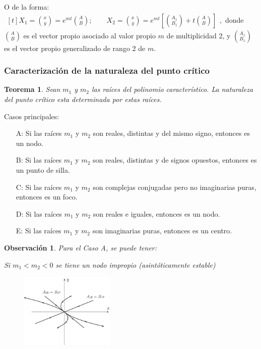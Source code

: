 \documentclass[a5paper,doc,10pt,noapacite]{apa6}
\newtheorem{teorema}{Teorema}
\newtheorem{observ}{Observación}
\begin{document}
{{\begin{APAenumerate}
	\vspace{1\baselineskip}
	\item O de la forma:
	\( \begin{aligned}[t]
	X_1 = \binom{x}{y}
		= e^{m t } \binom{A}{B}
	;
	\qquad
	X_2 = \binom{x}{y}
		= e^{m t } \left[ \binom{A_1}{B_1} + t \binom{A}{B} \right]
	\end{aligned},
	\)
	donde \(\binom{A}{B}\) es el vector propio asociado al valor propio \(m\) de multiplicidad 2, y  \(\binom{A_1}{B_1}\) es el vector propio generalizado de rango 2 de \(m\).
\end{APAenumerate}

%
\subsubsection{Caracterización de la naturaleza del punto crítico}

\begin{teorema}\label{teo-1}
	Sean \(m_1\) y \(m_2\) las raíces del polinomio característico. La naturaleza del punto crítico esta determinada por estas raíces.
\end{teorema}

Casos principales:
\begin{itemize}[leftmargin=15pt]
	\item[A:] Si las raíces \(m_1\) y \(m_2\) son reales, distintas y del mismo signo, entonces es un nodo.
	\item[B:] Si las raíces \(m_1\) y \(m_2\) son reales, distintas y de signos opuestos, entonces es un punto de silla.
	\item[C:] Si las raíces \(m_1\) y \(m_2\) son complejas conjugadas pero no imaginarias puras, entonces es un foco.
	\item[D:] Si las raíces \(m_1\) y \(m_2\) son reales e iguales, entonces es un nodo.
	\item[E:] Si las raíces \(m_1\) y \(m_2\) son imaginarias puras, entonces es un centro.
\end{itemize}

\newpage

\begin{observ}
	Para el Caso A, se puede tener:
	
	Si \(m_1<m_2<0\) se tiene un nodo impropio (asintóticamente estable)
	\vspace{-1\baselineskip}
	\begin{figure}[H]
		\captionsetup{justification=centering, labelfont=footnotesize, font=footnotesize}
		\centering
		\includegraphics[width=4.5cm]{Graficos/figura11}
	

\end{figure}
\end{observ}}}
\end{document}
